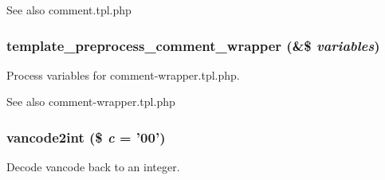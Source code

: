 \begin{DoxySeeAlso}{See also}
comment.tpl.php 
\end{DoxySeeAlso}
\hypertarget{comment_8module_aeccd0447ccb1d7a888c63c47444d54fc}{
\subsubsection[{template\_\-preprocess\_\-comment\_\-wrapper}]{\setlength{\rightskip}{0pt plus 5cm}template\_\-preprocess\_\-comment\_\-wrapper (\&\$ {\em variables})}}
\label{comment_8module_aeccd0447ccb1d7a888c63c47444d54fc}
Process variables for comment-\/wrapper.tpl.php.

\begin{DoxySeeAlso}{See also}
comment-\/wrapper.tpl.php 
\end{DoxySeeAlso}
\hypertarget{comment_8module_a4882cec0ad94842b2e7f9eb1b7ec27d2}{
\subsubsection[{vancode2int}]{\setlength{\rightskip}{0pt plus 5cm}vancode2int (\$ {\em c} = {\ttfamily '00'})}}
\label{comment_8module_a4882cec0ad94842b2e7f9eb1b7ec27d2}
Decode vancode back to an integer. 